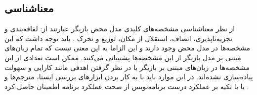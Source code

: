 \subsection{\gls{معناشناسی}}
از نظر معناشناسی مشخصه‌های کلیدی مدل محض بازیگر عبارتند از: لفافه‌بندی و
  \gls{تجزیه‌ناپذیر}‌ی، \gls{انصاف}، 
  استقلال از مکان، توزیع و تحرک
 \cite{KarmaniAgha_Actors_11}. 
  باید توجه داشت که این مشخصه‌ها در مدل محض  وجود دارند و این الزاما به این معنی نیست که تمام زبان‌های مبتنی بر مدل بازیگر از این مشخصه‌ها پشتیبانی می‌کنند. ممکن است تعدادی از این مشخصه‌ها در  زبان‌های مبتنی بر بازیگر  با در نظر گرفتن اهدفی مانند کارایی و سهولت پیاده‌سازی نشده‌اند. در این موارد باید با به کار بردن ابزار‌های بررسی ایستا، مترجم‌ها و یا با تکیه بر عملکرد درست برنامه‌نویس از صحت عملکرد برنامه‌ اطمینان حاصل کرد \cite{ActorsJVM2009}. 
